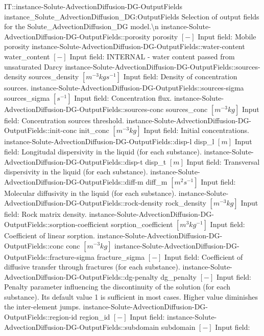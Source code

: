 \begin{SelectionType}
	{IT::instance-Solute-AdvectionDiffusion-DG-OutputFields}
	{instance{\_}Solute{\_}AdvectionDiffusion{\_}DG:OutputFields}
	{{{Selection of output fields for the Solute{\_}AdvectionDiffusion{\_}DG model.{\textbackslash}n}%
}}
		\SelectionItem
			{instance-Solute-AdvectionDiffusion-DG-OutputFields::porosity}
			{porosity}
			{{{}{$[-]$}{ Input field: Mobile porosity}%
}}
		\SelectionItem
			{instance-Solute-AdvectionDiffusion-DG-OutputFields::water-content}
			{water{\_}content}
			{{{}{$[-]$}{ Input field: INTERNAL - water content passed from unsaturated Darcy}%
}}
		\SelectionItem
			{instance-Solute-AdvectionDiffusion-DG-OutputFields::sources-density}
			{sources{\_}density}
			{{{}{$[m^{-3}kgs^{-1}]$}{ Input field: Density of concentration sources.}%
}}
		\SelectionItem
			{instance-Solute-AdvectionDiffusion-DG-OutputFields::sources-sigma}
			{sources{\_}sigma}
			{{{}{$[s^{-1}]$}{ Input field: Concentration flux.}%
}}
		\SelectionItem
			{instance-Solute-AdvectionDiffusion-DG-OutputFields::sources-conc}
			{sources{\_}conc}
			{{{}{$[m^{-3}kg]$}{ Input field: Concentration sources threshold.}%
}}
		\SelectionItem
			{instance-Solute-AdvectionDiffusion-DG-OutputFields::init-conc}
			{init{\_}conc}
			{{{}{$[m^{-3}kg]$}{ Input field: Initial concentrations.}%
}}
		\SelectionItem
			{instance-Solute-AdvectionDiffusion-DG-OutputFields::disp-l}
			{disp{\_}l}
			{{{}{$[m]$}{ Input field: Longitudal dispersivity in the liquid (for each substance).}%
}}
		\SelectionItem
			{instance-Solute-AdvectionDiffusion-DG-OutputFields::disp-t}
			{disp{\_}t}
			{{{}{$[m]$}{ Input field: Transversal dispersivity in the liquid (for each substance).}%
}}
		\SelectionItem
			{instance-Solute-AdvectionDiffusion-DG-OutputFields::diff-m}
			{diff{\_}m}
			{{{}{$[m^{2}s^{-1}]$}{ Input field: Molecular diffusivity in the liquid (for each substance).}%
}}
		\SelectionItem
			{instance-Solute-AdvectionDiffusion-DG-OutputFields::rock-density}
			{rock{\_}density}
			{{{}{$[m^{-3}kg]$}{ Input field: Rock matrix density.}%
}}
		\SelectionItem
			{instance-Solute-AdvectionDiffusion-DG-OutputFields::sorption-coefficient}
			{sorption{\_}coefficient}
			{{{}{$[m^{3}kg^{-1}]$}{ Input field: Coefficient of linear sorption.}%
}}
		\SelectionItem
			{instance-Solute-AdvectionDiffusion-DG-OutputFields::conc}
			{conc}
			{{{}{$[m^{-3}kg]$}{ }%
}}
		\SelectionItem
			{instance-Solute-AdvectionDiffusion-DG-OutputFields::fracture-sigma}
			{fracture{\_}sigma}
			{{{}{$[-]$}{ Input field: Coefficient of diffusive transfer through fractures (for each substance).}%
}}
		\SelectionItem
			{instance-Solute-AdvectionDiffusion-DG-OutputFields::dg-penalty}
			{dg{\_}penalty}
			{{{}{$[-]$}{ Input field: Penalty parameter influencing the discontinuity of the solution (for each substance). Its default value 1 is sufficient in most cases.
Higher value diminishes the inter-element jumps.}%
}}
		\SelectionItem
			{instance-Solute-AdvectionDiffusion-DG-OutputFields::region-id}
			{region{\_}id}
			{{{}{$[-]$}{ Input field: }%
}}
		\SelectionItem
			{instance-Solute-AdvectionDiffusion-DG-OutputFields::subdomain}
			{subdomain}
			{{{}{$[-]$}{ Input field: }%
}}
\end{SelectionType}
